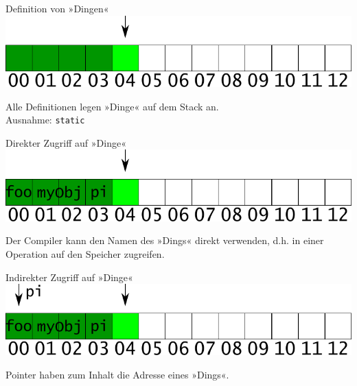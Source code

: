 \begin{frame}[fragile, t]{Definition von »Dingen«}
	\includegraphics[width=\linewidth]{images/stack_frag_store}
	
	\vspace{1em}
	
	Alle Definitionen legen »Dinge« auf dem Stack an.\\
	{\tiny Ausnahme: \verb|static|}
	
	{\footnotesize
	\begin{block}{}
		
	\end{block}
	}
\end{frame}

\begin{frame}[fragile, t]{Direkter Zugriff auf »Dinge«}
	\includegraphics[width=\linewidth]{images/object_names}
	
	\vspace{1em}
	
	Der Compiler kann den Namen des »Dings« direkt verwenden, d.h. in einer Operation auf den Speicher zugreifen.
	
	{\footnotesize
	\begin{block}{}
		
	\end{block}
	}
\end{frame}

\begin{frame}[fragile, t]{Indirekter Zugriff auf »Dinge«}
	\includegraphics[width=\linewidth]{images/object_points}
	
	\vspace{1em}
	
	Pointer haben zum Inhalt die Adresse eines »Dings«.
	
	{\footnotesize
	\begin{block}{}
		
	\end{block}
	}
\end{frame}

